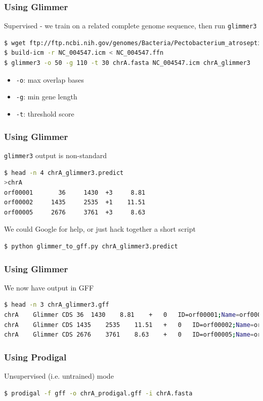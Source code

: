 \documentclass[table]{beamer}
\begin{document}
  \begin{frame}[fragile]
    \frametitle{Using Glimmer}
    Supervised - we train on a related complete genome sequence, then run \texttt{glimmer3}
    \begin{lstlisting}[language=bash]
$ wget ftp://ftp.ncbi.nih.gov/genomes/Bacteria/Pectobacterium_atrosepticum_SCRI1043_uid57957/NC_004547.ffn    
$ build-icm -r NC_004547.icm < NC_004547.ffn
$ glimmer3 -o 50 -g 110 -t 30 chrA.fasta NC_004547.icm chrA_glimmer3
    \end{lstlisting}
    \begin{itemize}
      \item \texttt{-o}: max overlap bases
      \item \texttt{-g}: min gene length
      \item \texttt{-t}:  threshold score
    \end{itemize}
\end{frame}  

  \begin{frame}[fragile]
    \frametitle{Using Glimmer}
    \texttt{glimmer3} output is non-standard
    \begin{lstlisting}[language=bash]
$ head -n 4 chrA_glimmer3.predict 
>chrA
orf00001       36     1430  +3     8.81
orf00002     1435     2535  +1    11.51
orf00005     2676     3761  +3     8.63
    \end{lstlisting}
    We could Google for help, or just hack together a short script
    \begin{lstlisting}[language=bash]
$ python glimmer_to_gff.py chrA_glimmer3.predict
    \end{lstlisting}    
\end{frame}  

  \begin{frame}[fragile]
    \frametitle{Using Glimmer}
    We now have output in GFF
    \begin{lstlisting}[language=bash]
$ head -n 3 chrA_glimmer3.gff 
chrA	Glimmer	CDS	36	1430	8.81	+	0	ID=orf00001;Name=orf00001
chrA	Glimmer	CDS	1435	2535	11.51	+	0	ID=orf00002;Name=orf00002
chrA	Glimmer	CDS	2676	3761	8.63	+	0	ID=orf00005;Name=orf00005
    \end{lstlisting}
\end{frame}  

  \begin{frame}[fragile]
    \frametitle{Using Prodigal}
    Unsupervised (i.e. untrained) mode
    \begin{lstlisting}[language=bash]
$ prodigal -f gff -o chrA_prodigal.gff -i chrA.fasta
    \end{lstlisting}
\end{frame}  
\end{document}
